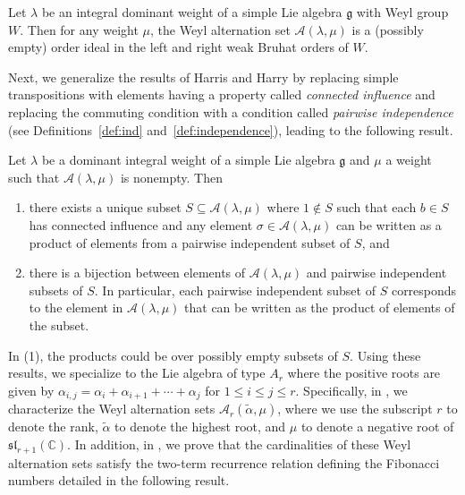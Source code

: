 \documentclass{amsart}
\newenvironment{customthm}[1] {\renewcommand\theinnercustomthm{#1}\innercustomthm}
  {\endinnercustomthm}
\theoremstyle{definition}
\newcommand{\hroot}{\tilde{\alpha}}
\newcommand{\calA}{\mathcal{A}}
\begin{document}
\begin{customthm}{\ref{prop:ideal_conditions_on_lambda}}
    Let $\lambda$ be an integral dominant weight of a simple Lie algebra $\mathfrak{g}$ with Weyl group $W$. Then for any weight $\mu$, the Weyl alternation set $\calA(\lambda,\mu)$ is a (possibly empty) order ideal in the left and right weak Bruhat orders of $W$.
\end{customthm}




Next, we generalize the results of Harris and Harry by replacing simple transpositions with elements having a property called \textit{connected influence} and replacing the commuting condition with a condition called \textit{pairwise independence} 
(see Definitions~\ref{def:ind} and~\ref{def:independence}), 
leading to the following result. 

\begin{customthm}{\ref{thm:characterize_BAS}}
    Let $\lambda$ be a dominant integral weight of a simple Lie algebra $\mathfrak{g}$ and $\mu$ a weight such that $\calA(\lambda,\mu)$ is nonempty. Then
    
    \begin{enumerate}[(1)]
        \item there exists a unique subset $S\subseteq \calA(\lambda,\mu)$ where $1\notin S$ such that each $b\in S$ has connected influence and any element $\sigma\in \calA(\lambda,\mu)$ can be written as a product of elements from a pairwise independent subset of $S$, and 
        \item there is a bijection between elements of $\calA(\lambda,\mu)$ and pairwise independent subsets of $S$. In particular, each pairwise independent subset of $S$ corresponds to the element in $\calA(\lambda,\mu)$ that can be written as the product of elements of the subset.
    \end{enumerate}
\end{customthm}


\setcounter{section}{1}
\setcounter{theorem}{0}
In (1), the products could be over possibly empty subsets of $S$. 
Using these results, we specialize to the Lie algebra of type $A_r$ where the positive roots are given by $\alpha_{i,j}=\alpha_i+\alpha_{i+1}+\cdots+\alpha_j$ for $1\leq i\leq j\leq r$. 
Specifically, in , we characterize the Weyl alternation sets $\mathcal{A}_r(\hroot,\mu)$, where we use the subscript $r$ to denote the rank, $\hroot$ to denote the highest root, and $\mu$ to denote a negative root of $\mathfrak{sl}_{r+1}(\mathbb{C})$. 
In addition, in , we prove that the cardinalities of these Weyl alternation sets satisfy the two-term recurrence relation defining the Fibonacci numbers detailed in the following result.
\end{document}
